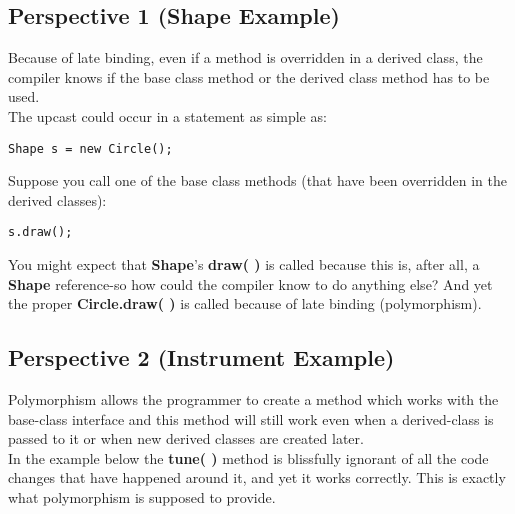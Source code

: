 \documentclass[10pt,letterpaper]{report}
\begin{document}
\subsection{Perspective 1 (Shape Example)}
Because of late binding, even if a method is overridden in a derived class, the compiler knows if the base class method or the derived class method has to be used.\\

The upcast could occur in a statement as simple as:
\begin{lstlisting}
Shape s = new Circle();
\end{lstlisting}

Suppose you call one of the base class methods (that have been overridden in the derived classes):
\begin{lstlisting}
s.draw();
\end{lstlisting}

You might expect that \textbf{Shape}'s \textbf{draw( )} is called because this is, after all, a \textbf{Shape} reference-so how could the compiler know to do anything else? And yet the proper \textbf{Circle.draw( )} is called because of late binding (polymorphism).
\subsection{Perspective 2 (Instrument Example)}
Polymorphism allows the programmer to create a method which works with the base-class interface and this method will still work even when a derived-class is passed to it or when new derived classes are created later.\\

In the example below the \textbf{tune( )} method is blissfully ignorant of all the code changes that have happened around it, and yet it works correctly. This is exactly what polymorphism is supposed to provide.
\end{document}
